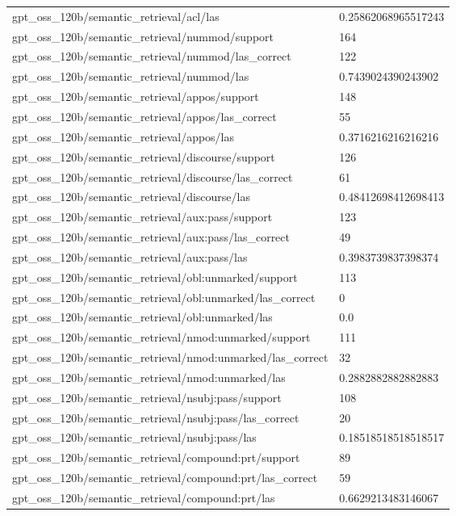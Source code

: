 \begin{tabular}{ll}
gpt\_oss\_120b/semantic\_retrieval/acl/las & 0.25862068965517243 \\
gpt\_oss\_120b/semantic\_retrieval/nummod/support & 164 \\
gpt\_oss\_120b/semantic\_retrieval/nummod/las\_correct & 122 \\
gpt\_oss\_120b/semantic\_retrieval/nummod/las & 0.7439024390243902 \\
gpt\_oss\_120b/semantic\_retrieval/appos/support & 148 \\
gpt\_oss\_120b/semantic\_retrieval/appos/las\_correct & 55 \\
gpt\_oss\_120b/semantic\_retrieval/appos/las & 0.3716216216216216 \\
gpt\_oss\_120b/semantic\_retrieval/discourse/support & 126 \\
gpt\_oss\_120b/semantic\_retrieval/discourse/las\_correct & 61 \\
gpt\_oss\_120b/semantic\_retrieval/discourse/las & 0.48412698412698413 \\
gpt\_oss\_120b/semantic\_retrieval/aux:pass/support & 123 \\
gpt\_oss\_120b/semantic\_retrieval/aux:pass/las\_correct & 49 \\
gpt\_oss\_120b/semantic\_retrieval/aux:pass/las & 0.3983739837398374 \\
gpt\_oss\_120b/semantic\_retrieval/obl:unmarked/support & 113 \\
gpt\_oss\_120b/semantic\_retrieval/obl:unmarked/las\_correct & 0 \\
gpt\_oss\_120b/semantic\_retrieval/obl:unmarked/las & 0.0 \\
gpt\_oss\_120b/semantic\_retrieval/nmod:unmarked/support & 111 \\
gpt\_oss\_120b/semantic\_retrieval/nmod:unmarked/las\_correct & 32 \\
gpt\_oss\_120b/semantic\_retrieval/nmod:unmarked/las & 0.2882882882882883 \\
gpt\_oss\_120b/semantic\_retrieval/nsubj:pass/support & 108 \\
gpt\_oss\_120b/semantic\_retrieval/nsubj:pass/las\_correct & 20 \\
gpt\_oss\_120b/semantic\_retrieval/nsubj:pass/las & 0.18518518518518517 \\
gpt\_oss\_120b/semantic\_retrieval/compound:prt/support & 89 \\
gpt\_oss\_120b/semantic\_retrieval/compound:prt/las\_correct & 59 \\
gpt\_oss\_120b/semantic\_retrieval/compound:prt/las & 0.6629213483146067 \\

\end{tabular}
